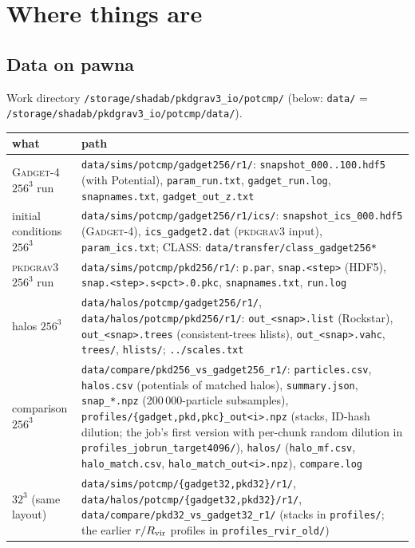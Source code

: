 \documentclass[11pt,a4paper]{article}
\newcommand{\pkd}{\textsc{pkdgrav3}}
\newcommand{\gad}{\textsc{Gadget-4}}
\newcommand{\fp}[1]{\nolinkurl{#1}}
\begin{document}
\section{Where things are}
\label{sec:paths}

\subsection*{Data on pawna}
Work directory \fp{/storage/shadab/pkdgrav3_io/potcmp/} (below: \fp{data/} = \fp{/storage/shadab/pkdgrav3_io/potcmp/data/}).
\begin{center}\small
\begin{tabular}{@{}L{0.24\textwidth}L{0.73\textwidth}@{}}
\toprule
what & path \\
\midrule
\gad{} $256^3$ run & \fp{data/sims/potcmp/gadget256/r1/}: \fp{snapshot_000..100.hdf5} (with Potential), \fp{param_run.txt}, \fp{gadget_run.log}, \fp{snapnames.txt}, \fp{gadget_out_z.txt} \\
initial conditions $256^3$ & \fp{data/sims/potcmp/gadget256/r1/ics/}: \fp{snapshot_ics_000.hdf5} (\gad{}), \fp{ics_gadget2.dat} (\pkd{} input), \fp{param_ics.txt}; CLASS: \fp{data/transfer/class_gadget256*} \\
\pkd{} $256^3$ run & \fp{data/sims/potcmp/pkd256/r1/}: \fp{p.par}, \fp{snap.<step>} (HDF5), \fp{snap.<step>.s<pct>.0.pkc}, \fp{snapnames.txt}, \fp{run.log} \\
halos $256^3$ & \fp{data/halos/potcmp/gadget256/r1/}, \fp{data/halos/potcmp/pkd256/r1/}: \fp{out_<snap>.list} (Rockstar), \fp{out_<snap>.trees} (consistent-trees hlists), \fp{out_<snap>.vahc}, \fp{trees/}, \fp{hlists/}; \fp{../scales.txt} \\
comparison $256^3$ & \fp{data/compare/pkd256_vs_gadget256_r1/}: \fp{particles.csv}, \fp{halos.csv} (potentials of matched halos), \fp{summary.json}, \fp{snap_*.npz} (200\,000-particle subsamples), \fp{profiles/{gadget,pkd,pkc}_out<i>.npz} (stacks, ID-hash dilution; the job's first version with per-chunk random dilution in \fp{profiles_jobrun_target4096/}), \fp{halos/} (\fp{halo_mf.csv}, \fp{halo_match.csv}, \fp{halo_match_out<i>.npz}), \fp{compare.log} \\
$32^3$ (same layout) & \fp{data/sims/potcmp/{gadget32,pkd32}/r1/}, \fp{data/halos/potcmp/{gadget32,pkd32}/r1/}, \fp{data/compare/pkd32_vs_gadget32_r1/} (stacks in \fp{profiles/}; the earlier $r/R_{\rm vir}$ profiles in \fp{profiles_rvir_old/}) \\

\end{tabular}
\end{center}
\end{document}

